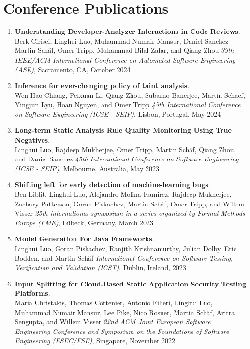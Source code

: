\section{\sc Conference Publications}


\begin{enumerate}

  \item \textbf{Understanding Developer-Analyzer Interactions in Code Reviews}.
  \\  Berk Cirisci, Linghui Luo, Muhammad Numair
  Mansur, Daniel Sanchez Martin Schäf, Omer Tripp, Muhammad
  Bilal Zafar, and Qiang Zhou
  \emph{39th IEEE/ACM International Conference on Automated Software Engineering (ASE)},
  Sacramento, CA, October 2024

  \item \textbf{Inference for ever-changing policy of taint analysis}.
  \\   Wen-Hao Chiang, Peixuan Li, Qiang Zhou, Subarno Banerjee, Martin Schaef, Yingjun Lyu, Hoan Nguyen, and Omer Tripp
  \emph{45th International Conference on Software Engineering (ICSE - SEIP)},
  Lisbon, Portugal, May 2024

\item \textbf{Long-term Static Analysis Rule Quality Monitoring Using True Negatives}.
\\  Linghui Luo, Rajdeep Mukherjee, Omer Tripp, Martin Sch\"af, Qiang Zhou, and Daniel Sanchez
\emph{45th International Conference on Software Engineering (ICSE - SEIP)},
Melbourne, Australia, May 2023

\item \textbf{Shifting left for early detection of machine-learning bugs}.
\\  Ben Liblit, Linghui Luo, Alejandro Molina Ramirez, Rajdeep Mukherjee, Zachary Patterson, Goran Piskachev, Martin Sch\"af, Omer Tripp, and Willem Visser
\emph{25th international symposium in a series organized by Formal Methods Europe (FME)},
L\"ubeck, Germany, March 2023


\item \textbf{Model Generation For Java Frameworks}.
\\  Linghui Luo, Goran Piskachev, Ranjith Krishnamurthy, Julian Dolby, Eric Bodden, and Martin Sch\"af
\emph{International Conference on Software Testing, Verification and Validation (ICST)},
Dublin, Ireland, 2023

\item \textbf{Input Splitting for Cloud-Based Static Application Security Testing Platforms}.
\\ Maria Christakis, Thomas Cottenier, Antonio Filieri, Linghui Luo, Muhammad Numair Mansur, Lee Pike, Nico Rosner, Martin Sch\"af, Aritra Sengupta, and Willem Visser
\emph{22nd ACM Joint European Software Engineering Conference and Symposium on the Foundations of Software Engineering (ESEC/FSE)},
Singapore, November 2022


\end{enumerate}
